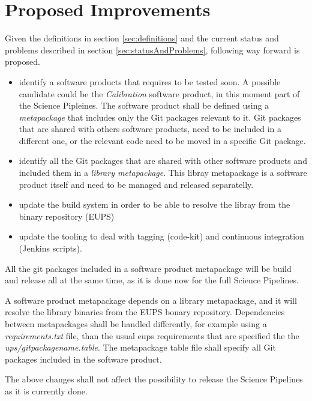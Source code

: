 \newpage
\section{Proposed Improvements}\label{sec:proimp}

Given the definitions in section \ref{sec:definitions} and the current status and problems described in section \ref{sec:statusAndProblems}, following way forward is proposed.

\begin{itemize}
\item identify a software products that requires to be tested soon.
A possible candidate could be the \textit{Calibration} software product, in this moment part of the Science Pipleines. 
The software product shall be defined using a \textit{metapackage} that includes only the Git packages relevant to it.
Git packages that are shared with others software products, need to be included in a different one, or the relevant code need to be moved in a specific Git package.
\item identify all the Git packages that are shared with other software products and included them in a \textit{library metapackage}.
This libray metapackage is a software product itself and need to be managed and released separatelly.
\item update the build system in order to be able to resolve the libray from the binary repository (EUPS)
\item update the tooling to deal with tagging (code-kit) and continuous integration (Jenkins scripts).
\end{itemize}

All the git packages included in a software product metapackage will be build and release all at the same time, as it is done now for the full Science Pipelines.

A software product metapackage depends on a library metapackage, and it will resolve the library binaries from the EUPS bonary repository.
Dependencies between metapackages shall be handled differently, for example using a \textit{requirements.txt} file, than the usual eups requirements that are specified the the \textit{ups/gitpackagename.table}.
The metapackage table file shall specify all Git packages included in the  software product.

The above changes shall not affect the possibility to release the Science Pipelines as it is currently done.

